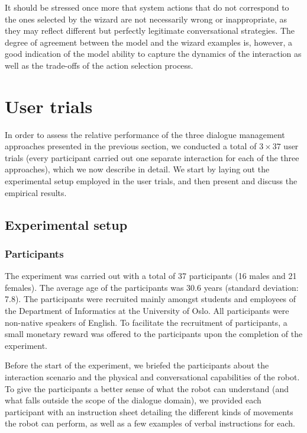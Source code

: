 It should be stressed once more that system actions that do not correspond to the ones selected by the wizard are not necessarily wrong or inappropriate, as they may reflect different but perfectly legitimate conversational strategies. The degree of agreement between the model and the wizard examples is, however, a good indication of the model ability to capture the dynamics of the interaction as well as the trade-offs of the action selection process. 

\section{User trials}

In order to assess the relative performance of the three dialogue management approaches presented in the previous section, we conducted a total of $3 \times 37$ user trials (every participant carried out one separate interaction for each of the three approaches), which we now describe in detail. We start by laying out the experimental setup employed in the user trials, and then present and discuss the empirical results. 

\subsection{Experimental setup}

\subsubsection*{Participants}

The experiment was carried out with a total of 37 participants (16 males and 21 females).  The average age of the participants was 30.6 years (standard deviation: 7.8). The participants were recruited mainly amongst students and employees of the Department of Informatics at the University of Oslo. All participants were non-native speakers of English. To facilitate the recruitment of participants, a small monetary reward was offered to the participants upon the completion of the experiment. 

Before the start of the experiment, we briefed the participants about the interaction scenario and the physical and conversational capabilities of the robot. To give the participants a better sense of what the robot can understand (and what falls outside the scope of the dialogue domain), we provided each participant with an instruction sheet detailing the different kinds of movements the robot can perform, as well as a few examples of verbal instructions for each.

